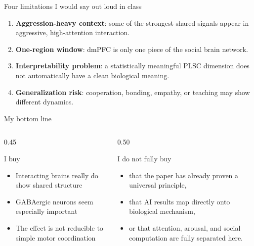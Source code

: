 \documentclass[aspectratio=169,11pt]{beamer}
\begin{document}
\begin{frame}{Four limitations I would say out loud in class}
\begin{enumerate}
  \item \textbf{Aggression-heavy context}: some of the strongest shared signals appear in aggressive, high-attention interaction.
  \item \textbf{One-region window}: dmPFC is only one piece of the social brain network.
  \item \textbf{Interpretability problem}: a statistically meaningful PLSC dimension does not automatically have a clean biological meaning.
  \item \textbf{Generalization risk}: cooperation, bonding, empathy, or teaching may show different dynamics.
\end{enumerate}
\end{frame}

\begin{frame}{My bottom line}
\begin{columns}[T]
  \begin{column}{0.45\textwidth}
    \begin{block}{I buy}
    \begin{itemize}
      \item Interacting brains really do show shared structure
      \item GABAergic neurons seem especially important
      \item The effect is not reducible to simple motor coordination
    \end{itemize}
    \end{block}
  \end{column}
  \begin{column}{0.50\textwidth}
    \begin{alertblock}{I do not fully buy}
    \begin{itemize}
      \item that the paper has already proven a universal principle,
      \item that AI results map directly onto biological mechanism,
      \item or that attention, arousal, and social computation are fully separated here.
    \end{itemize}
    \end{alertblock}
  \end{column}
\end{columns}
\end{frame}
\end{document}
